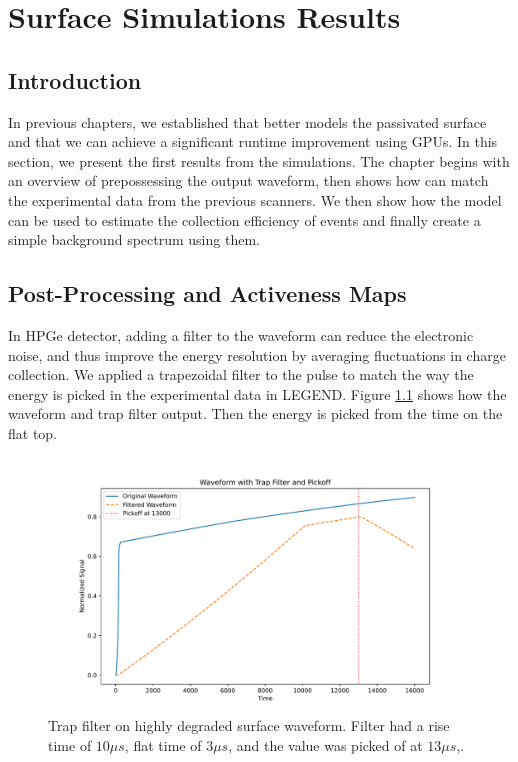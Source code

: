 \chapter{Surface Simulations Results}
\label{chap:ehd_res}

\section{Introduction}
In previous chapters, we established that {\ehd} better models the passivated surface and that we can achieve a significant runtime improvement using GPUs. In this section, we present the first results from the simulations. The chapter begins with an overview of prepossessing the output waveform, then shows how {\ehd} can match the experimental data from the previous scanners. We then show how the model can be used to estimate the collection efficiency of {\onbb} events and finally create a simple background spectrum using them.

\section{Post-Processing and Activeness Maps}

In HPGe detector, adding a filter to the waveform can reduce the electronic noise, and thus improve the energy resolution by averaging fluctuations in charge collection. We applied a trapezoidal filter to the pulse to match the way the energy is picked in the experimental data in LEGEND. Figure \ref{ch5_fig_trap_filter} shows how the waveform and trap filter output. Then the energy is picked from the time on the flat top.

\begin{figure}%
\centering
\includegraphics[trim={0cm 0cm 0cm 0cm},clip,width=0.9\linewidth]{ch5/figs/trap_filt.pdf}
\caption{Trap filter on highly degraded surface waveform. Filter had a rise time of $10 \mu s$, flat time of $3 \mu s$, and the value was picked of at $13 \mu s$,.}
\label{ch5_fig_trap_filter}
\end{figure}

